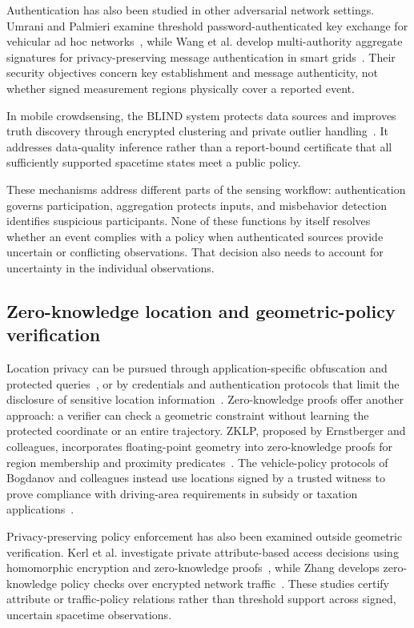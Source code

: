 \documentclass[pdflatex,iicol,sn-mathphys-num]{sn-jnl}
\theoremstyle{thmstyleone}
\begin{document}
Authentication has also been studied in other adversarial network settings. Umrani and Palmieri examine threshold password-authenticated key exchange for vehicular ad hoc networks~\citep{CybersecUmrani2025}, while Wang et al. develop multi-authority aggregate signatures for privacy-preserving message authentication in smart grids~\citep{CybersecWang2026}. Their security objectives concern key establishment and message authenticity, not whether signed measurement regions physically cover a reported event.

In mobile crowdsensing, the BLIND system protects data sources and improves truth discovery through encrypted clustering and private outlier handling~\citep{JNCaAgate2024}. It addresses data-quality inference rather than a report-bound certificate that all sufficiently supported spacetime states meet a public policy.

These mechanisms address different parts of the sensing workflow: authentication governs participation, aggregation protects inputs, and misbehavior detection identifies suspicious participants. None of these functions by itself resolves whether an event complies with a policy when authenticated sources provide uncertain or conflicting observations. That decision also needs to account for uncertainty in the individual observations.

\subsection{Zero-knowledge location and geometric-policy verification}
Location privacy can be pursued through application-specific obfuscation and protected queries~\citep{Mdee2022,Atmaca2024}, or by credentials and authentication protocols that limit the disclosure of sensitive location information~\citep{Ghani2025,Zhang2025Sybil,Wang2025ZKAuth}. Zero-knowledge proofs offer another approach: a verifier can check a geometric constraint without learning the protected coordinate or an entire trajectory. ZKLP, proposed by Ernstberger and colleagues, incorporates floating-point geometry into zero-knowledge proofs for region membership and proximity predicates~\citep{ZKLP}. The vehicle-policy protocols of Bogdanov and colleagues instead use locations signed by a trusted witness to prove compliance with driving-area requirements in subsidy or taxation applications~\citep{VehiclePolicy}.

Privacy-preserving policy enforcement has also been examined outside geometric verification. Kerl et al. investigate private attribute-based access decisions using homomorphic encryption and zero-knowledge proofs~\citep{CybersecKerl2025}, while Zhang develops zero-knowledge policy checks over encrypted network traffic~\citep{CybersecZhang2026}. These studies certify attribute or traffic-policy relations rather than threshold support across signed, uncertain spacetime observations.
\end{document}
